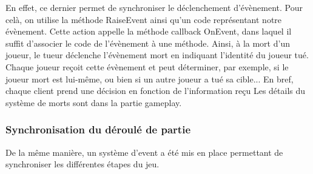         En effet, ce dernier permet de synchroniser le déclenchement d'évènement. Pour celà, on utilise la méthode RaiseEvent ainsi
        qu'un code représentant notre évènement. Cette action appelle la méthode callback OnEvent, dans laquel il suffit d'associer le
        code de l'évènement à une méthode. Ainsi, à la mort d'un joueur, le tueur déclenche l'évènement mort en indiquant l'identité du
        joueur tué. Chaque joueur reçoit cette évènement et peut déterminer, par exemple, si le joueur mort est lui-même, ou bien si un
        autre joueur a tué sa cible... En bref, chaque client prend une décision en fonction de l'information reçu
        Les détails du système de morts sont dans la partie gameplay.

    \subsubsection{Synchronisation du déroulé de partie}
        De la même manière, un système d'event a été mis en place permettant de synchroniser les différentes étapes du jeu.

